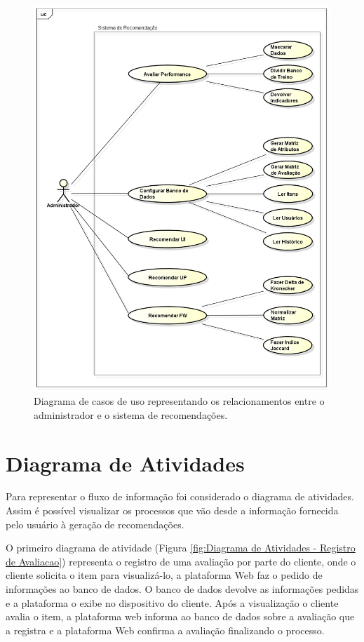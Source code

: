  \begin{figure}[htp]
    \begin{center}
    \includegraphics[width=1\textwidth]{img/CasosDeUso}
    \end{center}
    \caption{Diagrama de casos de uso representando os relacionamentos entre o administrador e o sistema de recomendações.}
    \label{fig:Diagrama de Casos de Uso}
\end{figure}

\section{Diagrama de Atividades} %
\label{sec:Diagrama de Atividades}

Para representar o fluxo de informação foi considerado o diagrama de atividades. Assim é possível visualizar os processos que vão desde a informação fornecida pelo usuário à geração de recomendações.

O primeiro diagrama de atividade (Figura \ref{fig:Diagrama de Atividades - Registro de Avaliacao}) representa o registro de uma avaliação por parte do cliente, onde o cliente solicita o item para visualizá-lo, a plataforma Web faz o pedido de informações ao banco de dados. O banco de dados devolve as informações pedidas e a plataforma o exibe no dispositivo do cliente. Após a visualização o cliente avalia o item, a plataforma web informa ao banco de dados sobre a avaliação que a registra e a plataforma Web confirma a avaliação finalizando o processo.

